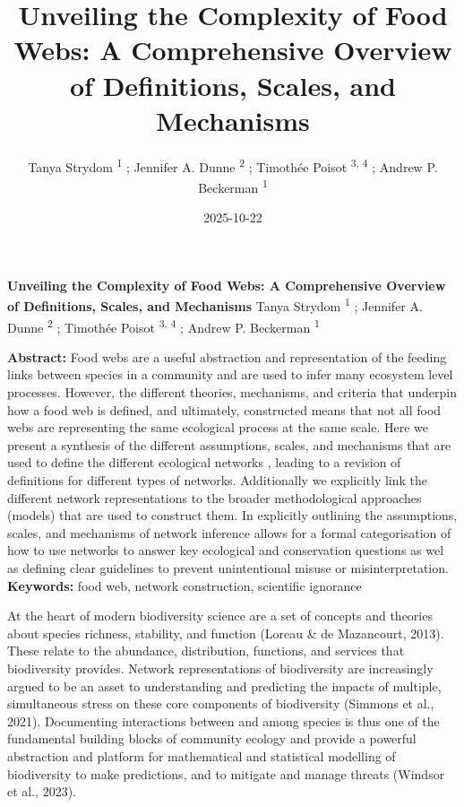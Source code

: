 \documentclass[
]{article}
\title{Unveiling the Complexity of Food Webs: A Comprehensive Overview
of Definitions, Scales, and Mechanisms}
\author{Tanya Strydom %
%
\textsuperscript{%
%
1%
}%
; Jennifer A. Dunne %
%
\textsuperscript{%
%
2%
}%
; Timothée Poisot %
%
\textsuperscript{%
3,%
4%
}%
; Andrew P. Beckerman %
%
\textsuperscript{%
%
1%
}%
}
\date{2025-10-22}
\begin{document}
\thispagestyle{empty}
{\bfseries\sffamily\Large Unveiling the Complexity of Food Webs: A
Comprehensive Overview of Definitions, Scales, and Mechanisms}
\vfil
Tanya Strydom %
%
\textsuperscript{%
%
1%
}%
; Jennifer A. Dunne %
%
\textsuperscript{%
%
2%
}%
; Timothée Poisot %
%
\textsuperscript{%
3,%
4%
}%
; Andrew P. Beckerman %
%
\textsuperscript{%
%
1%
}%

\vfil
{\small
\textbf{Abstract:} Food webs are a useful abstraction and representation
of the feeding links between species in a community and are used to
infer many ecosystem level processes. However, the different theories,
mechanisms, and criteria that underpin how a food web is defined, and
ultimately, constructed means that not all food webs are representing
the same ecological process at the same scale. Here we present a
synthesis of the different assumptions, scales, and mechanisms that are
used to define the different ecological networks , leading to a revision
of definitions for different types of networks. Additionally we
explicitly link the different network representations to the broader
methodological approaches (models) that are used to construct them. In
explicitly outlining the assumptions, scales, and mechanisms of network
inference allows for a formal categorisation of how to use networks to
answer key ecological and conservation questions as wel as defining
clear guidelines to prevent unintentional misuse or misinterpretation.
\vfil
\textbf{Keywords:} %
food web, network construction, %
scientific ignorance%
}
\clearpage
\setcounter{page}{1}
\doublespacing
\linenumbers


At the heart of modern biodiversity science are a set of concepts and
theories about species richness, stability, and function (Loreau \& de
Mazancourt, 2013). These relate to the abundance, distribution,
functions, and services that biodiversity provides. Network
representations of biodiversity are increasingly argued to be an asset
to understanding and predicting the impacts of multiple, simultaneous
stress on these core components of biodiversity (Simmons et al., 2021).
Documenting interactions between and among species is thus one of the
fundamental building blocks of community ecology and provide a powerful
abstraction and platform for mathematical and statistical modelling of
biodiversity to make predictions, and to mitigate and manage threats
(Windsor et al., 2023).
\end{document}

